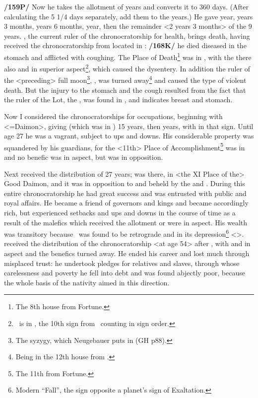 \textbf{/159P/} Now he takes the allotment of years and converts it to 360 days. (After calculating the 5 1/4 days separately, add them to the years.) He gave \Sagittarius\xspace 1 year, \Capricorn\xspace 2 years 3 months, \Aquarius\xspace 2 years 6 months, \Pisces\xspace 1 year, then \Aries\xspace the remainder <2 years 3 months> of the 9 years. \Mars, the current ruler of the chronocratorship for health, brings death, having received the chronocratorship from \Saturn\xspace located in \Sagittarius: \textbf{/168K/} he died diseased in the stomach and afflicted with coughing. The Place of Death\footnote{The 8th house from Fortune.} was in \Pisces, with the \Moon\xspace there also and \Saturn\xspace in superior aspect\footnote{\Saturn\, is in \Sagittarius, the 10th sign from \Pisces\, counting in sign order.}, which caused the dysentery. In addition the ruler of the <preceding> full moon\footnote{The syzygy, which Neugebauer puts in \Capricorn (GH p88).}, \Saturn, was turned away\footnote{Being in the 12th house from \Capricorn.} and caused the type of violent death. But the injury to the stomach and the cough resulted from the fact that the ruler of the Lot, the \Sun, was found in \Cancer, and \Cancer\xspace indicates breast and stomach.

Now I considered the chronocratorships for occupations, beginning with \Scorpio\xspace <=Daimon>, giving \Mars\xspace (which was in \Scorpio) 15 years, then \Sagittarius\xspace 12 years, with \Saturn\xspace in that sign. Until age 27 he was a vagrant, subject to ups and downs. His considerable property was squandered by his guardians, for
the <11th> Place of Accomplishment\footnote{The 11th from Fortune.} was in \Gemini\xspace and no benefic was in aspect, but \Saturn\xspace was in
opposition. 

Next \Capricorn\xspace received the distribution of 27 years; \Jupiter\xspace was there, in <the XI Place of the> Good Daimon, and it was in opposition to and beheld by the \Sun\xspace and \Venus. During this entire chronocratorship he had great success and was entrusted with public and royal affairs. He became a friend of governors and kings and became accordingly rich, but experienced setbacks and ups and downs in the course of time as a result of the malefics which received the allotment or were in aspect. His wealth was transitory because \Jupiter\, was found to be retrograde and in its depression\footnote{Modern ``Fall'', the sign opposite a planet's sign of Exaltation.} <\Capricorn>. \Aquarius\xspace received
the distribution of the chronocratorship <at age 54> after \Capricorn, with \Mars\xspace and \Mercury\xspace in aspect and
the benefics turned away. He ended his career and lost much through misplaced trust: he undertook pledges for relatives and slaves, through whose carelessness and poverty he fell into debt and was found abjectly poor, because the whole basis of the nativity aimed in this direction. 


